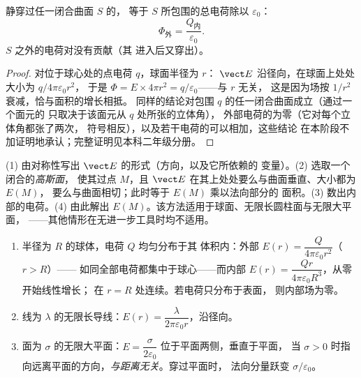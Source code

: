 \begin{theorem}[高斯定理]\label{thm:b1:electrostatics-gauss:gauss}
静穿过任一闭合曲面 $S$ 的，
等于 $S$ 所包围的总电荷除以 $\varepsilon_0$：
\[
\Phi_{\text{外}} = \frac{Q_{\text{内}}}{\varepsilon_0} .
\]
$S$ 之外的电荷对没有贡献（其
进入后又穿出）。
\end{theorem}

\begin{proof}
对位于球心处的点电荷 $q$，球面半径为 $r$：
$\vect E$ 沿径向，在球面上处处大小为 $q/4\pi\varepsilon_0r^2$，
于是 $\Phi = E \times 4\pi r^2 = q/\varepsilon_0$——与 $r$ 无关，
这是因为场按 $1/r^2$ 衰减，恰与面积的增长相抵。
同样的结论对包围 $q$ 的任一闭合曲面成立（通过一个面元的
只取决于该面元从 $q$ 处所张的立体角），
外部电荷的为零（它对每个立体角都张了两次，
符号相反），以及若干电荷的可以相加，这些结论
在本阶段不加证明地承认；完整证明见本科二年级分册。
\end{proof}

\begin{method}[使用高斯定理]\label{meth:b1:electrostatics-gauss:gauss}
(1) 由对称性写出 $\vect E$ 的形式（方向，以及它所依赖的
变量）。(2) 选取一个闭合的\emph{高斯面}，
使其过点 $M$，且 $\vect E$ 在其上处处要么与曲面垂直、大小都为 $E(M)$，
要么与曲面相切；此时等于 $E(M)$ 乘以法向部分的
面积。(3) 数出内部的电荷。(4) 由此解出
$E(M)$。该方法适用于球面、无限长圆柱面与无限大平面，
——其他情形在无进一步工具时均不适用。
\end{method}

\begin{proposition}[三种经典场]\label{prop:b1:electrostatics-gauss:three}
\begin{enumerate}
  \item 半径为 $R$ 的球体，电荷 $Q$ 均匀分布于其
        体积内：外部 $E(r) = \dfrac{Q}{4\pi\varepsilon_0r^2}$（$r > R$）——
        如同全部电荷都集中于球心——而内部 $E(r) =
        \dfrac{Qr}{4\pi\varepsilon_0R^3}$，从零开始线性增长；
        在 $r = R$ 处连续。若电荷只分布于表面，
        则内部场为零。
  \item 线为 $\lambda$ 的无限长导线：$E(r) =
        \dfrac{\lambda}{2\pi\varepsilon_0 r}$，沿径向。
  \item 面为 $\sigma$ 的无限大平面：$E = \dfrac{\sigma}{2\varepsilon_0}$
        位于平面两侧，垂直于平面，
        当 $\sigma > 0$ 时指向远离平面的方向，\emph{与距离无关}。穿过平面时，
        法向分量跃变 $\sigma/\varepsilon_0$。
\end{enumerate}
\end{proposition}

